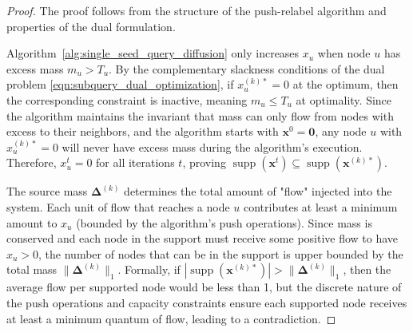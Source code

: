\documentclass{article} %
\begin{document}
\begin{proof}

The proof follows from the structure of the push-relabel algorithm and properties of the dual formulation.

Algorithm~\ref{alg:single_seed_query_diffusion} only increases $x_u$ when node $u$ has excess mass $m_u > T_u$. By the complementary slackness conditions of the dual problem \eqref{eqn:subquery_dual_optimization}, if $x_u^{(k)*} = 0$ at the optimum, then the corresponding constraint is inactive, meaning $m_u \leq T_u$ at optimality. Since the algorithm maintains the invariant that mass can only flow from nodes with excess to their neighbors, and the algorithm starts with $\mathbf{x}^0 = \mathbf{0}$, any node $u$ with $x_u^{(k)*} = 0$ will never have excess mass during the algorithm's execution. Therefore, $x_u^t = 0$ for all iterations $t$, proving $\operatorname{supp}(\mathbf{x}^t) \subseteq \operatorname{supp}(\mathbf{x}^{(k)*})$.

The source mass $\boldsymbol{\Delta}^{(k)}$ determines the total amount of "flow" injected into the system. Each unit of flow that reaches a node $u$ contributes at least a minimum amount to $x_u$ (bounded by the algorithm's push operations). Since mass is conserved and each node in the support must receive some positive flow to have $x_u > 0$, the number of nodes that can be in the support is upper bounded by the total mass $\|\boldsymbol{\Delta}^{(k)}\|_1$. Formally, if $|\operatorname{supp}(\mathbf{x}^{(k)*})| > \|\boldsymbol{\Delta}^{(k)}\|_1$, then the average flow per supported node would be less than 1, but the discrete nature of the push operations and capacity constraints ensure each supported node receives at least a minimum quantum of flow, leading to a contradiction.

\end{proof}
\end{document}
